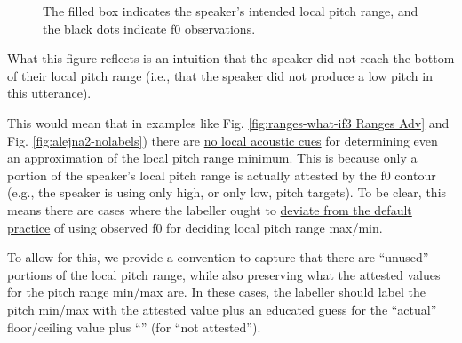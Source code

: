 \documentclass[11pt, twoside]{memoir}
\def\textlabel#1{{\relsize{-.5}\fontspec[Mapping=tex-text]{Roboto Mono}{#1}}}
\begin{document}
\begin{figure}[H]
\centering
{}
\caption{The filled box indicates the speaker’s intended local pitch range, and the black dots indicate f0 observations.%
\label{fig:ranges intuition alejna2}%
}
\end{figure}

What this figure reflects is an intuition that the speaker did not reach the bottom of their local pitch range (i.e., that the speaker did not produce a low pitch in this utterance).

This would mean that in examples like Fig. \ref{fig:ranges-what-if3 Ranges Adv} and Fig. \ref{fig:alejna2-nolabels}) there are \uline{no local acoustic cues} for determining even an approximation of the local pitch range minimum. This is because only a portion of the speaker’s local pitch range is actually attested by the f0 contour (e.g., the speaker is using only high, or only low, pitch targets). To be clear, this means there are cases where the labeller ought to \uline{deviate from the default practice} of using observed f0 for deciding local pitch range max\slash min.

To allow for this, we provide a convention to capture that there are “unused” portions of the local pitch range, while also preserving what the attested values for the pitch range min\slash max are. In these cases, the labeller should label the pitch min\slash max with the attested value plus an educated guess for the “actual” floor\slash ceiling value plus “\textlabel{:na}” (for “not attested”).
\end{document}

